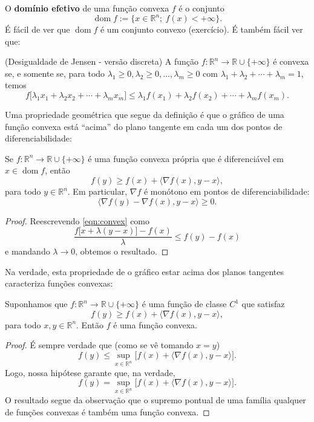 O \textbf{domínio efetivo} de uma função convexa $f$ é o conjunto
\[
\operatorname{dom} f := \big\{ x \in \mathbb{R}^n ; ~f(x) < + \infty \big\}.
\] É fácil de ver que $\operatorname{dom} f$ é um conjunto convexo (exercício). É também fácil ver que:

\begin{exer}(Desigualdade de Jensen - versão discreta)
	A função $f : \mathbb{R}^n \to \mathbb{R}\cup \{+ \infty\}$ é convexa se, e somente se, para todo $\lambda_1\ge 0, \lambda_2 \ge 0, \dots, \lambda_m \ge 0$ com $\lambda_1 + \lambda_2 + \cdots + \lambda_m = 1$, temos
	\[
	f \big[\lambda_1 x_1 + \lambda_2 x_2 + \cdots + \lambda_m x_m \big] \le \lambda_1 f(x_1) + \lambda_2 f(x_2) + \cdots + \lambda_m f(x_m).
	\]
\end{exer}

Uma propriedade geométrica que segue da definição é que o gráfico de uma função convexa está ``acima'' do plano tangente em cada um dos pontos de diferenciabilidade:

\begin{prop}\label{prop:convex-planosuporte}
	Se $f: \mathbb{R}^n \to \mathbb{R}\cup \{+ \infty\}$ é uma função convexa própria que é diferenciável em $x \in \operatorname{dom} f$, então
	\[
	f(y) \ge f(x) + \langle \nabla f (x), y-x \rangle,
	\] para todo $y \in \mathbb{R}^n$. Em particular, $\nabla f$ é monótono em pontos de diferenciabilidade:
	\[
	\langle \nabla f(y) - \nabla f(x), y-x \rangle \ge 0.
	\]
\end{prop}

\begin{proof}
	Reescrevendo \eqref{eqn:convex} como
	\[
	\frac{f \big[ x + \lambda (y-x) \big] - f(x)}{\lambda} \le f(y) - f(x)
	\] e mandando $\lambda \to 0$, obtemos o resultado.
\end{proof}

Na verdade, esta propriedade de o gráfico estar acima dos planos tangentes caracteriza funções convexas:

\begin{prop}\label{prop:convex-planosuporte2}
	Suponhamos que $f: \mathbb{R}^n \to \mathbb{R} \cup \{+ \infty\}$ é uma função de classe $C^1$ que satisfaz
	\[
	f(y) \ge f(x) + \langle \nabla f (x), y-x \rangle,
	\] para todo $x, y \in \mathbb{R}^n$. Então $f$ é uma função convexa.
\end{prop}

\begin{proof}
	É sempre verdade que (como se vê tomando $x = y$)
	\[
	f(y) \le \sup_{x \in \mathbb{R}^n} \Big[ f(x) + \langle \nabla f (x), y-x \rangle \Big].
	\] Logo, nossa hipótese garante que, na verdade,
	\[
	f(y) = \sup_{x \in \mathbb{R}^n} \Big[ f(x) + \langle \nabla f (x), y-x \rangle \Big].
	\] O resultado segue da observação que o supremo pontual de uma família qualquer de funções convexas é também uma função convexa.
\end{proof}

